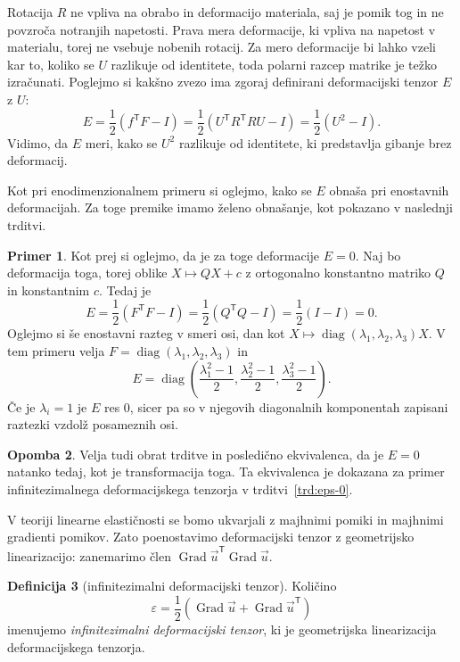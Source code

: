 \documentclass[12pt,a4paper,twoside]{article}
\theoremstyle{definition} %
\newtheorem{definicija}{Definicija}[section]
\newtheorem{primer}[definicija]{Primer}
\newtheorem{opomba}[definicija]{Opomba}
\theoremstyle{plain} %
\numberwithin{equation}{section}
\newcommand{\T}{\mathsf{T}}
\newcommand{\Grad}{\operatorname{Grad}}
\newcommand{\eps}{\varepsilon}
\newcommand{\vu}{\vec{u}}
\newcommand{\vX}{X}
\DeclareMathOperator{\diag}{diag}
\begin{document}
Rotacija $R$ ne vpliva na obrabo in deformacijo materiala, saj je pomik tog in ne povzroča notranjih
napetosti. Prava mera deformacije, ki vpliva na napetost v materialu, torej ne vsebuje nobenih
rotacij. Za mero deformacije bi lahko vzeli kar to, koliko se $U$ razlikuje od identitete, toda
polarni razcep matrike je težko izračunati. Poglejmo si kakšno zvezo ima zgoraj definirani
deformacijski tenzor $E$ z $U$:
\[
  E = \frac12(f^\T F - I) = \frac12(U^\T R^\T R U - I) = \frac12 (U^2 - I).
\]
Vidimo, da $E$ meri, kako se $U^2$ razlikuje od identitete, ki predstavlja
gibanje brez deformacij.

Kot pri enodimenzionalnem primeru si oglejmo, kako se $E$ obnaša pri enostavnih
deformacijah. Za toge premike imamo želeno obnašanje, kot pokazano v naslednji
trditvi.

\begin{primer}
  Kot prej si oglejmo, da je za toge deformacije $E = 0$.
 Naj bo deformacija toga, torej oblike $\vX \mapsto Q\vX +
c$ z ortogonalno konstantno matriko $Q$ in konstantnim $c$. Tedaj je
\[ E = \frac12 (F^\T F - I) = \frac12(Q^\T Q - I) = \frac12(I - I) = 0. \]
Oglejmo si še enostavni razteg v smeri osi, dan kot
$\vX \mapsto \diag(\lambda_1, \lambda_2, \lambda_3) \vX$.
V tem primeru velja $F = \diag(\lambda_1, \lambda_2, \lambda_3)$ in
  \[
    E = \diag\left(
      \frac{\lambda_1^2-1}{2},
      \frac{\lambda_2^2-1}{2},
      \frac{\lambda_3^2-1}{2}
    \right).
  \]
  Če je $\lambda_i = 1$ je $E$ res 0, sicer pa so v njegovih diagonalnih
  komponentah zapisani raztezki vzdolž posameznih osi.
\end{primer}
\begin{opomba}
  Velja tudi obrat trditve in posledično ekvivalenca, da je $E = 0$ natanko tedaj, kot je
  transformacija toga. Ta ekvivalenca je dokazana za primer infinitezimalnega deformacijskega
  tenzorja v trditvi~\ref{trd:eps-0}.
\end{opomba}

V teoriji linearne elastičnosti se bomo ukvarjali z majhnimi pomiki in majhnimi
gradienti pomikov. Zato poenostavimo deformacijski tenzor z geometrijsko
linearizacijo: zanemarimo člen $\Grad \vu^\T \Grad \vu$.

\begin{definicija}[infinitezimalni deformacijski tenzor]
  Količino
  \begin{equation}
    \eps = \frac{1}{2}(\Grad \vu + \Grad \vu^\T)
    \label{eq:eps}
  \end{equation}
  imenujemo \emph{infinitezimalni deformacijski tenzor}, ki je geometrijska
  linearizacija deformacijskega tenzorja.
\end{definicija}
\end{document}
